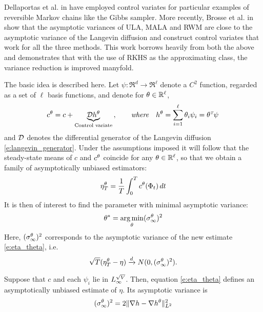 Dellaportas et al. in \cite{delkon12} have employed control variates for particular examples of reversible Markov chains like the Gibbs sampler.
More recently, Brosse et al. in \cite{brodurmeymou18} show that the asymptotic variances of ULA, MALA and RWM are close to the asymptotic variance of the Langevin diffusion and construct control variates that work for all the three methods. This work borrows heavily from both the above and demonstrates that with the use of RKHS as the approximating class, the variance reduction is improved manyfold. 

The basic idea is described here. Let $\psi\colon\Re^d\to\Re^\ell$ denote a $C^2$ function, regarded as a set of $\ell$ basis functions, and denote for $\theta\in\mathbb{R}^\ell$,
\begin{equation}
\begin{aligned}
c^\param  = c + \underbrace{\generate h^\param}_{\text{Control variate}} \,,
\qquad
\text{\it where}
\quad
h^\param  =  \sum_{i=1}^\ell \param_i \psi_i = \param^\transpose \psi\,
\end{aligned}
\label{e:h_and_c}
\end{equation}
and ${\cal D}$
denotes the differential generator of the Langevin diffusion \eqref{e:langevin_generator}.
Under the assumptions imposed it will follow that the steady-state means of $c$ and $c^\theta$ coincide for any $\theta\in\mathbb{R}^\ell$,  so that we obtain a family of asymptotically unbiased estimators:
\begin{equation}
\eta^\param_T =\frac{1}{T}\int_0^T c^\param(\markovstate_t)  \, dt
\label{e:eta_theta}
\end{equation}
It is then of interest to find the parameter with minimal asymptotic variance:
\begin{equation}
\param^* = \argmin_\param (\asymvar^\param)^2
\label{e:thetastar}
\end{equation}
Here, $(\sigma_\infty^\theta)^2$ corresponds to the asymptotic variance of the new estimate \eqref{e:eta_theta}, i.e.
\[
\sqrt{T} (\eta^\theta_T - \eta ) \xrightarrow[]{d} N (0,(\sigma_\infty^\theta)^2).
\]

\begin{proposition}
	\label{t:CV}
	Suppose that  $c$ and each $\psi_i$ lie in $L_\infty^{\sqrt{V}}$. Then, equation \eqref{e:eta_theta} defines an asymptotically unbiased estimate of $\eta$. Its asymptotic variance is
	\begin{equation}
	(\asymvar^\param)^2
	= 2  \| \nabla  h - \nabla h^\param  \|^2_{L^2}
	\label{e:avarCV}
	\end{equation}
\end{proposition}

